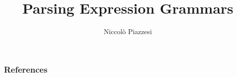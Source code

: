 \documentclass{beamer}
\title{Parsing Expression Grammars}
\author{Niccolò Piazzesi}
\institute[UniPi]{
    Università degli Studi di Pisa \\
    Anno Accademico 2020-21 
}
\begin{document}
    \begin{frame}
        \maketitle
    \end{frame}
    
    
    
	


    \begin{frame}[allowframebreaks]
     
        \frametitle{References}
        
        
    \end{frame}
\end{document}

